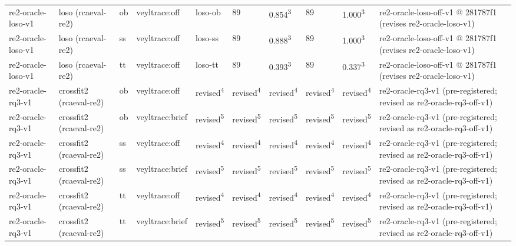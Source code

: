 \begin{table}[t]
\begin{tabular}{llllllllll}
re2-oracle-loso-v1 & loso (rcaeval-re2) & ob & veyltrace:off & loso-ob & 89 & 0.854\textsuperscript{3} & 89 & 1.000\textsuperscript{3} & re2-oracle-loso-off-v1 @ 281787f1 (revises re2-oracle-loso-v1) \\
re2-oracle-loso-v1 & loso (rcaeval-re2) & ss & veyltrace:off & loso-ss & 89 & 0.888\textsuperscript{3} & 89 & 1.000\textsuperscript{3} & re2-oracle-loso-off-v1 @ 281787f1 (revises re2-oracle-loso-v1) \\
re2-oracle-loso-v1 & loso (rcaeval-re2) & tt & veyltrace:off & loso-tt & 89 & 0.393\textsuperscript{3} & 89 & 0.337\textsuperscript{3} & re2-oracle-loso-off-v1 @ 281787f1 (revises re2-oracle-loso-v1) \\
re2-oracle-rq3-v1 & crossfit2 (rcaeval-re2) & ob & veyltrace:off & revised\textsuperscript{4} & revised\textsuperscript{4} & revised\textsuperscript{4} & revised\textsuperscript{4} & revised\textsuperscript{4} & re2-oracle-rq3-v1 (pre-registered; revised as re2-oracle-rq3-off-v1) \\
re2-oracle-rq3-v1 & crossfit2 (rcaeval-re2) & ob & veyltrace:brief & revised\textsuperscript{5} & revised\textsuperscript{5} & revised\textsuperscript{5} & revised\textsuperscript{5} & revised\textsuperscript{5} & re2-oracle-rq3-v1 (pre-registered; revised as re2-oracle-rq3-off-v1) \\
re2-oracle-rq3-v1 & crossfit2 (rcaeval-re2) & ss & veyltrace:off & revised\textsuperscript{4} & revised\textsuperscript{4} & revised\textsuperscript{4} & revised\textsuperscript{4} & revised\textsuperscript{4} & re2-oracle-rq3-v1 (pre-registered; revised as re2-oracle-rq3-off-v1) \\
re2-oracle-rq3-v1 & crossfit2 (rcaeval-re2) & ss & veyltrace:brief & revised\textsuperscript{5} & revised\textsuperscript{5} & revised\textsuperscript{5} & revised\textsuperscript{5} & revised\textsuperscript{5} & re2-oracle-rq3-v1 (pre-registered; revised as re2-oracle-rq3-off-v1) \\
re2-oracle-rq3-v1 & crossfit2 (rcaeval-re2) & tt & veyltrace:off & revised\textsuperscript{4} & revised\textsuperscript{4} & revised\textsuperscript{4} & revised\textsuperscript{4} & revised\textsuperscript{4} & re2-oracle-rq3-v1 (pre-registered; revised as re2-oracle-rq3-off-v1) \\
re2-oracle-rq3-v1 & crossfit2 (rcaeval-re2) & tt & veyltrace:brief & revised\textsuperscript{5} & revised\textsuperscript{5} & revised\textsuperscript{5} & revised\textsuperscript{5} & revised\textsuperscript{5} & re2-oracle-rq3-v1 (pre-registered; revised as re2-oracle-rq3-off-v1) \\

\end{tabular}
\end{table}
